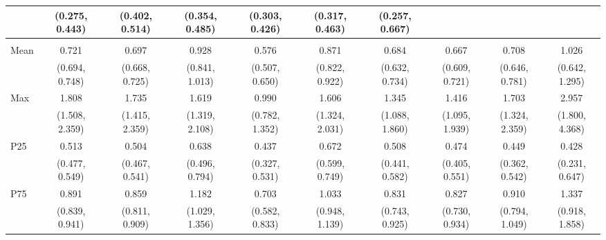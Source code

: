 {\begin{tabular}{l|c|c|c|c|c|c|c|c|c}
& {\scriptsize (0.275, 0.443)}
& {\scriptsize (0.402, 0.514)}
& {\scriptsize (0.354, 0.485)}
& {\scriptsize (0.303, 0.426)}
& {\scriptsize (0.317, 0.463)}
& {\scriptsize (0.257, 0.667)}
\\ [0.1cm]
\hline
\noalign{\smallskip}
\multicolumn{10}{l}{\textbf{Effect with Leads and Lags}} \\
\noalign{\smallskip}
\hline
Mean
& 0.721 & 0.697 & 0.928 & 0.576 & 0.871 & 0.684 & 0.667 & 0.708 & 1.026 \\
& {\scriptsize (0.694, 0.748)}
& {\scriptsize (0.668, 0.725)}
& {\scriptsize (0.841, 1.013)}
& {\scriptsize (0.507, 0.650)}
& {\scriptsize (0.822, 0.922)}
& {\scriptsize (0.632, 0.734)}
& {\scriptsize (0.609, 0.721)}
& {\scriptsize (0.646, 0.781)}
& {\scriptsize (0.642, 1.295)}
\\ [0.1cm]
\hline
Max
& 1.808 & 1.735 & 1.619 & 0.990 & 1.606 & 1.345 & 1.416 & 1.703 & 2.957 \\
& {\scriptsize (1.508, 2.359)}
& {\scriptsize (1.415, 2.359)}
& {\scriptsize (1.319, 2.108)}
& {\scriptsize (0.782, 1.352)}
& {\scriptsize (1.324, 2.031)}
& {\scriptsize (1.088, 1.860)}
& {\scriptsize (1.095, 1.939)}
& {\scriptsize (1.324, 2.359)}
& {\scriptsize (1.800, 4.368)}
\\ [0.1cm]
\hline
P25
& 0.513 & 0.504 & 0.638 & 0.437 & 0.672 & 0.508 & 0.474 & 0.449 & 0.428 \\
& {\scriptsize (0.477, 0.549)}
& {\scriptsize (0.467, 0.541)}
& {\scriptsize (0.496, 0.794)}
& {\scriptsize (0.327, 0.531)}
& {\scriptsize (0.599, 0.749)}
& {\scriptsize (0.441, 0.582)}
& {\scriptsize (0.405, 0.551)}
& {\scriptsize (0.362, 0.542)}
& {\scriptsize (0.231, 0.647)}
\\ [0.1cm]
\hline
P75
& 0.891 & 0.859 & 1.182 & 0.703 & 1.033 & 0.831 & 0.827 & 0.910 & 1.337 \\
& {\scriptsize (0.839, 0.941)}
& {\scriptsize (0.811, 0.909)}
& {\scriptsize (1.029, 1.356)}
& {\scriptsize (0.582, 0.833)}
& {\scriptsize (0.948, 1.139)}
& {\scriptsize (0.743, 0.925)}
& {\scriptsize (0.730, 0.934)}
& {\scriptsize (0.794, 1.049)}
& {\scriptsize (0.918, 1.858)}
\\ [0.1cm]
\hline
\hline
\end{tabular}
}
